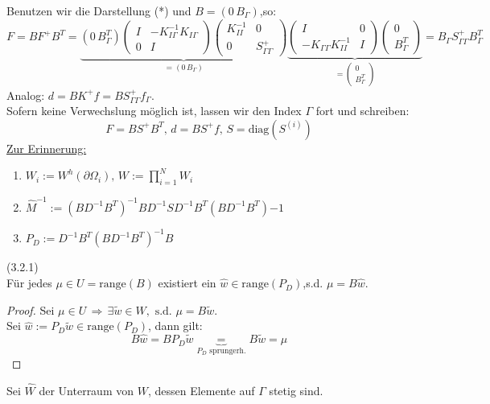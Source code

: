 Benutzen wir die Darstellung (*) und $B=(0 \, B_\Gamma)$,so:
\[ 
  F=BF^+B^T =\underbrace{ (0 \, B^T_\Gamma)
 \begin{pmatrix}
I & - K^{-1}_{I\Gamma} K_{I \Gamma} \\
0 & I
\end{pmatrix}
\begin{pmatrix}
K^{-1}_{II} & 0 \\
0 & S^+_{\Gamma \Gamma}
\end{pmatrix}}_{=(0 \, B_\Gamma)}
\underbrace{
\begin{pmatrix}
I & 0 \\
-K_{\Gamma \Gamma }K^{-1}_{II} & I 
\end{pmatrix}
\begin{pmatrix}
0 \\ B^T_\Gamma
\end{pmatrix}}_{
  =\begin{pmatrix}
    0 \\ B^T_\Gamma
\end{pmatrix}}
= B_\Gamma S^+_{\Gamma \Gamma} B^T_\Gamma
\]
Analog: $d=BK^+f = BS^+_{\Gamma \Gamma}f_\Gamma$.\\
Sofern keine Verwechslung möglich ist, lassen wir den Index $\Gamma$ fort und schreiben:
\[ F=BS^+B^T,\, d=BS^+f,\, S=\text{diag}(S^{(i)}) \]
\underline{Zur Erinnerung:}
\begin{enumerate}
\item
$W_i := W^h(\partial \Omega_i),\, W := \prod_{i=1}^N W_i $
\item
${\hat M}^{-1} := (BD^{-1}B^T)^{-1} BD^{-1}SD^{-1}B^T (BD^{-1}B^T){-1} $
\item
$P_D := D^{-1}B^T (BD^{-1}B^T)^{-1}B$
\end{enumerate}

\begin{lemma}(3.2.1)\\
Für jedes $\mu \in U=\text{range} (B)$ existiert ein $\hat w \in \text{range}(P_D)$,s.d. $\mu = B\hat w$.
\end{lemma}
\begin{proof}
Sei $\mu \in U \, \Rightarrow \, \exists \tilde w \in W,\text{ s.d. } \mu =B\tilde w$.\\
Sei $\hat w := P_D\tilde w \in \text{range}(P_D)$, dann gilt:
\[ B\hat w =BP_D\tilde w \underbrace{=}_{P_D \text{ sprungerh.}} B\tilde w = \mu \]
\end{proof}

Sei $\hat{W}$ der Unterraum von $W$, dessen Elemente auf $\Gamma$ stetig sind. 

